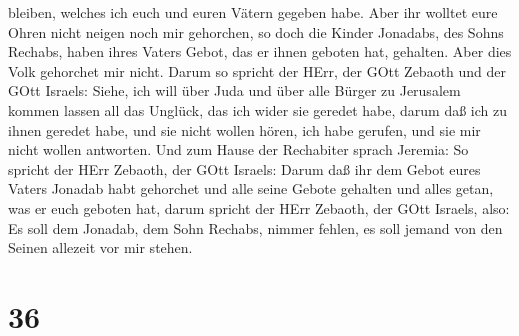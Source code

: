 bleiben, welches ich euch und euren Vätern gegeben habe. Aber ihr
wolltet eure Ohren nicht neigen noch mir gehorchen,  so
doch die Kinder Jonadabs, des Sohns Rechabs, haben ihres Vaters Gebot,
das er ihnen geboten hat, gehalten. Aber dies Volk gehorchet mir nicht.
 Darum so spricht der HErr, der GOtt Zebaoth und der GOtt
Israels: Siehe, ich will über Juda und über alle Bürger zu Jerusalem
kommen lassen all das Unglück, das ich wider sie geredet habe, darum daß
ich zu ihnen geredet habe, und sie nicht wollen hören, ich habe gerufen,
und sie mir nicht wollen antworten.  Und zum Hause der
Rechabiter sprach Jeremia: So spricht der HErr Zebaoth, der GOtt
Israels: Darum daß ihr dem Gebot eures Vaters Jonadab habt gehorchet und
alle seine Gebote gehalten und alles getan, was er euch geboten hat,
 darum spricht der HErr Zebaoth, der GOtt Israels, also: Es
soll dem Jonadab, dem Sohn Rechabs, nimmer fehlen, es soll jemand von
den Seinen allezeit vor mir stehen.

\hypertarget{section-35}{%
\section{36}\label{section-35}}

